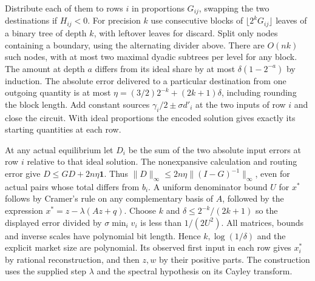 \documentclass[11pt,oneside,openany,notitlepage]{report}
\begin{document}
Distribute each of them to rows \(i\) in proportions \(G_{ij}\), swapping
the two destinations if \(H_{ij}<0\). For precision \(k\) use consecutive
blocks of \(\lfloor 2^kG_{ij}\rfloor\) leaves of a binary tree of depth
\(k\), with leftover leaves for discard. Split only nodes containing a
boundary, using the alternating divider above. There are \(O(nk)\) such
nodes, with at most two maximal dyadic subtrees per level for any block.
The amount at depth \(a\) differs from its ideal share by at most
\(\delta(1-2^{-a})\) by induction. The absolute error delivered to a
particular destination from one outgoing quantity is at most
\(\eta=(3/2)2^{-k}+(2k+1)\delta\), including rounding the block length.
Add constant sources \(\gamma_i/2\pm\sigma d'_i\) at the two inputs of
row \(i\) and close the circuit. With ideal proportions the encoded
solution gives exactly its starting quantities at each row.

At any actual equilibrium let \(D_i\) be the sum of the two absolute
input errors at row \(i\) relative to that ideal solution. The
nonexpansive calculation and routing error give
\(D\le GD+2n\eta\mathbf1\). Thus
\(\|D\|_\infty\le2n\eta\|(I-G)^{-1}\|_\infty\), even for actual pairs
whose total differs from \(b_i\). A uniform denominator bound \(U\) for
\(x^*\) follows by Cramer's rule on any complementary basis of \(A\),
followed by the expression \(x^*=z-\lambda(Az+q)\). Choose \(k\) and
\(\delta\le2^{-k}/(2k+1)\) so the displayed error divided by
\(\sigma\min_i v_i\) is less than \(1/(2U^2)\). All matrices, bounds and
inverse scales have polynomial bit length. Hence \(k,\log(1/\delta)\)
and the explicit market size are polynomial. Its observed first input
in each row gives \(x_i^*\) by rational reconstruction, and then \(z,w\)
by their positive parts. The construction uses the supplied step
\(\lambda\) and the spectral hypothesis on its Cayley transform.
\end{document}
